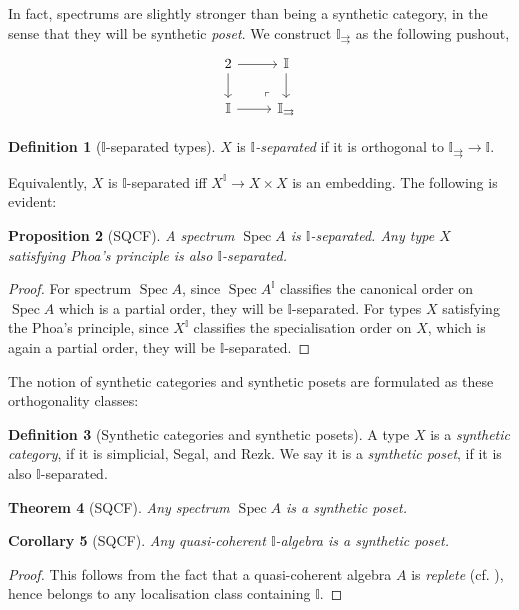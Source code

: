 \documentclass[12pt]{amsart}
\newtheorem{theorem}{Theorem}[section]
\newtheorem{corollary}[theorem]{Corollary}
\newtheorem{proposition}[theorem]{Proposition}
\theoremstyle{definition}
\newtheorem{definition}[theorem]{Definition}
\newcommand{\mbb}[1]{\mathbb{#1}}
\newcommand{\I}{\mbb I}
\newcommand{\spec}{\operatorname{Spec}}
\begin{document}
In fact, spectrums are slightly stronger than being a synthetic category, in the sense that they will be synthetic \emph{poset}. We construct $\I_{\rightrightarrows}$ as the following pushout,
\[
\begin{tikzcd}
  2 \ar[r] \ar[d] & \I \ar[d] \\ 
  \I \ar[r] & \I_{\rightrightarrows}
  \arrow["\lrcorner"{anchor=center, pos=0.125, rotate=180}, draw=none, from=2-2, to=1-1]
\end{tikzcd}
\]

\begin{definition}[$\I$-separated types]
  $X$ is \emph{$\I$-separated} if it is orthogonal to $\I_{\rightrightarrows} \to \I$.
\end{definition}

Equivalently, $X$ is $\I$-separated iff $X^\I \to X \times X$ is an embedding. The following is evident:

\begin{proposition}[SQCF]
  A spectrum $\spec A$ is $\I$-separated. Any type $X$ satisfying Phoa's principle is also $\I$-separated.
\end{proposition}
\begin{proof}
  For spectrum $\spec A$, since $\spec A^\I$ classifies the canonical order on $\spec A$ which is a partial order, they will be $\I$-separated. For types $X$ satisfying the Phoa's principle, since $X^\I$ classifies the specialisation order on $X$, which is again a partial order, they will be $\I$-separated.
\end{proof}

The notion of synthetic categories and synthetic posets are formulated as these orthogonality classes:

\begin{definition}[Synthetic categories and synthetic posets]
  A type $X$ is a \emph{synthetic category}, if it is simplicial, Segal, and Rezk. We say it is a \emph{synthetic poset}, if it is also $\I$-separated.
\end{definition}

\begin{theorem}[SQCF]\label{thm:affineposet}
  Any spectrum $\spec A$ is a synthetic poset.
\end{theorem}

\begin{corollary}[SQCF]\label{thm:qcalgebraposet}
  Any quasi-coherent $\I$-algebra is a synthetic poset.
\end{corollary}
\begin{proof}
  This follows from the fact that a quasi-coherent algebra $A$ is \emph{replete} (cf. ), hence belongs to any localisation class containing $\I$.
\end{proof}
\end{document}
